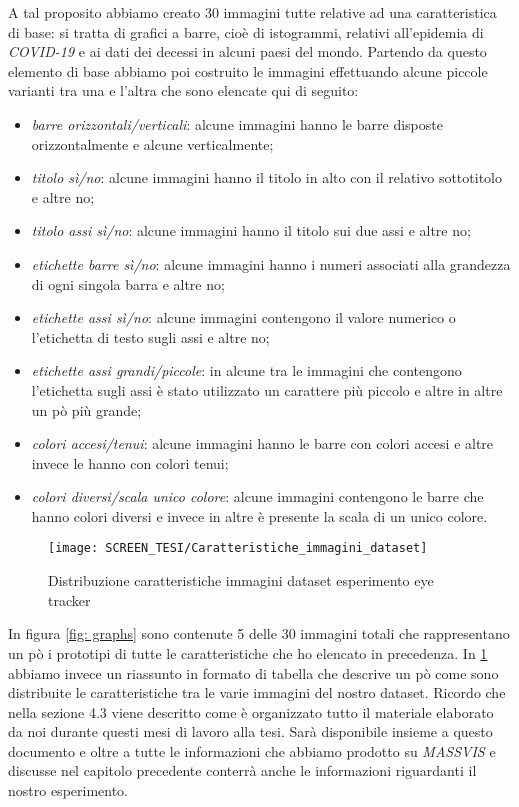 \documentclass[%
	corpo=12pt,
    twoside,
    stile=classica,
    oldstyle,
    tipotesi=custom,
    greek,
    evenboxes,
]{toptesi}
\begin{document}
{A tal proposito abbiamo creato 30 immagini tutte relative ad una caratteristica di base: si tratta di grafici a barre, cioè di istogrammi, relativi all'epidemia di \textit{COVID-19} e ai dati dei decessi in alcuni paesi del mondo. Partendo da questo elemento di base abbiamo poi costruito le immagini effettuando alcune piccole varianti tra una e l'altra che sono elencate qui di seguito:
\begin{itemize}
\item \textit{barre orizzontali/verticali}: alcune immagini hanno le barre disposte orizzontalmente e alcune verticalmente;
\item \textit{titolo sì/no}: alcune immagini hanno il titolo in alto con il relativo sottotitolo e altre no;
\item \textit{titolo assi sì/no}: alcune immagini hanno il titolo sui due assi e altre no;
\item \textit{etichette barre sì/no}: alcune immagini hanno i numeri associati alla grandezza di ogni singola barra e altre no;
\item \textit{etichette assi sì/no}: alcune immagini contengono il valore numerico o l'etichetta di testo sugli assi e altre no;
\item \textit{etichette assi grandi/piccole}: in alcune tra le immagini che contengono l'etichetta sugli assi è stato utilizzato un carattere più piccolo e altre in altre un pò più grande;
\item \textit{colori accesi/tenui}: alcune immagini hanno le barre con colori accesi e altre invece le hanno con colori tenui;
\item \textit{colori diversi/scala unico colore}: alcune immagini contengono le barre che hanno colori diversi e invece in altre è presente la scala di un unico colore.
\end{itemize}


\begin{figure}[H]\centering
\texttt{[image: SCREEN\_TESI/Caratteristiche\_immagini\_dataset]}
\caption{Distribuzione caratteristiche immagini dataset esperimento eye tracker}\label{fig: figura_distribuzione_caratteristiche}
\end{figure}

In figura \ref{fig: graphs} sono contenute 5 delle 30 immagini totali che rappresentano un pò i prototipi di tutte le caratteristiche che ho elencato in precedenza. In  \ref{fig: figura_distribuzione_caratteristiche} abbiamo invece un riassunto in formato di tabella che descrive un pò come sono distribuite le caratteristiche tra le varie immagini del nostro dataset. Ricordo che nella sezione 4.3 viene descritto come è organizzato tutto il materiale elaborato da noi durante questi mesi di lavoro alla tesi. Sarà disponibile insieme a questo documento e oltre a tutte le informazioni che abbiamo prodotto su \textit{MASSVIS} e discusse nel capitolo precedente conterrà anche le informazioni riguardanti il nostro esperimento.

}
\end{document}
